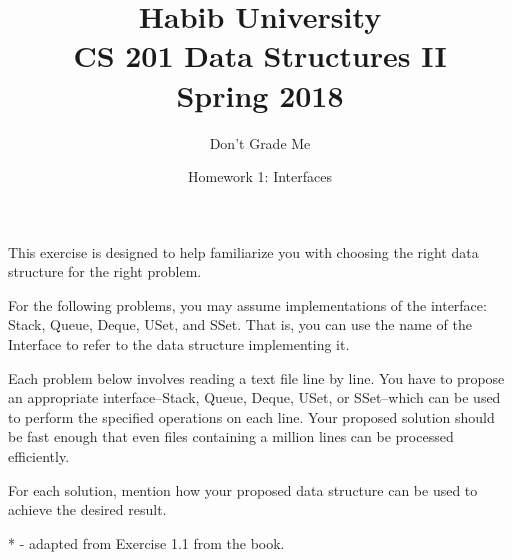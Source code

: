 \documentclass[addpoints]{exam}
\title{Habib University\\CS 201 Data Structures II\\Spring 2018}
\author{Don't Grade Me}  %
\date{Homework 1: Interfaces}
\begin{document}
\maketitle

\begin{questions}


This exercise is designed to help familiarize you with choosing the right data structure for the right problem.

For the following problems, you may assume implementations of the interface: Stack, Queue, Deque, USet, and SSet. That is, you can use the name of the Interface to refer to the data structure implementing it.

Each problem below involves reading a text file line by line. You have to propose an appropriate interface--Stack, Queue, Deque, USet, or SSet--which can be used to perform the specified operations on each line. Your proposed solution should be fast enough that even files containing a million lines can be processed efficiently.

For each solution, mention how your proposed data structure can be used to achieve the desired result.

* - adapted from Exercise 1.1 from the book.

\end{questions}
\end{document}
